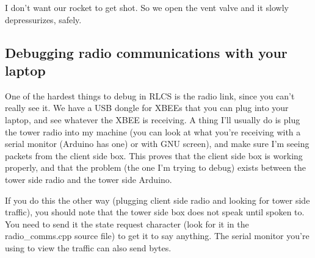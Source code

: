 \documentclass[11pt]{article}
\begin{document}
I don't want our rocket to get shot. So we open the vent valve and it
slowly depressurizes, safely.

\subsection{Debugging radio communications with your laptop}
\label{sec:org6fc63bd}

One of the hardest things to debug in RLCS is the radio link, since you
can't really see it. We have a USB dongle for XBEEs that you can plug into
your laptop, and see whatever the XBEE is receiving. A thing I'll usually
do is plug the tower radio into my machine (you can look at what you're
receiving with a serial monitor (Arduino has one) or with GNU screen), and
make sure I'm seeing packets from the client side box. This proves that the
client side box is working properly, and that the problem (the one I'm
trying to debug) exists between the tower side radio and the tower side
Arduino.

If you do this the other way (plugging client side radio and looking for
tower side traffic), you should note that the tower side box does not speak
until spoken to. You need to send it the state request character (look for
it in the radio\_comms.cpp source file) to get it to say anything. The
serial monitor you're using to view the traffic can also send bytes.
\end{document}
